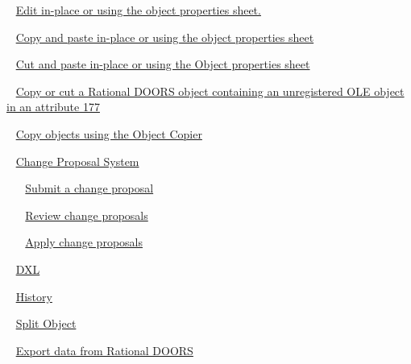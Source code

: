 \documentclass[11pt,a4paper]{article}
\begin{document}
\,\,\, \href{https://www.ibm.com/support/knowledgecenter/search/Edit%20in-place%20or%20using%20the%20object%20properties%20sheet.?scope=SSYQBZ_9.6.1}{Edit in-place or using the object properties sheet.}

\,\,\, \href{https://www.ibm.com/support/knowledgecenter/search/Copy%20and%20paste%20in-place%20or%20using%20the%20object%20properties%20sheet?scope=SSYQBZ_9.6.1}{Copy and paste in-place or using the object properties sheet}

\,\,\, \href{https://www.ibm.com/support/knowledgecenter/search/Cut%20and%20paste%20in-place%20or%20using%20the%20Object%20properties%20sheet?scope=SSYQBZ_9.6.1}{Cut and paste in-place or using the Object properties sheet}

\,\,\, \href{https://www.ibm.com/support/knowledgecenter/search/Copy%20or%20cut%20a%20Rational%20DOORS%20object%20containing%20an%20unregistered%20OLE%20object%20in%20an%20attribute%20177?scope=SSYQBZ_9.6.1}{Copy or cut a Rational DOORS object containing an unregistered OLE object in an attribute 177}

\,\,\, \href{https://www.ibm.com/support/knowledgecenter/search/Copy%20objects%20using%20the%20Object%20Copier?scope=SSYQBZ_9.6.1}{Copy objects using the Object Copier}

\,\,\, \href{https://www.ibm.com/support/knowledgecenter/search/Change%20Proposal%20System?scope=SSYQBZ_9.6.1}{Change Proposal System}

\,\,\, \,\,\, \href{https://www.ibm.com/support/knowledgecenter/search/Submit%20a%20change%20proposal?scope=SSYQBZ_9.6.1}{Submit a change proposal}

\,\,\, \,\,\, \href{https://www.ibm.com/support/knowledgecenter/search/Review%20change%20proposals?scope=SSYQBZ_9.6.1}{Review change proposals}

\,\,\, \,\,\, \href{https://www.ibm.com/support/knowledgecenter/search/Apply%20change%20proposals?scope=SSYQBZ_9.6.1}{Apply change proposals}

\,\,\, \href{https://www.ibm.com/support/knowledgecenter/search/DXL?scope=SSYQBZ_9.6.1}{DXL}

\,\,\, \href{https://www.ibm.com/support/knowledgecenter/search/History?scope=SSYQBZ_9.6.1}{History}

\,\,\, \href{https://www.ibm.com/support/knowledgecenter/search/Split%20Object?scope=SSYQBZ_9.6.1}{Split Object}

\,\,\, \href{https://www.ibm.com/support/knowledgecenter/search/Export%20data%20from%20Rational%20DOORS?scope=SSYQBZ_9.6.1}{Export data from Rational DOORS}
\end{document}
